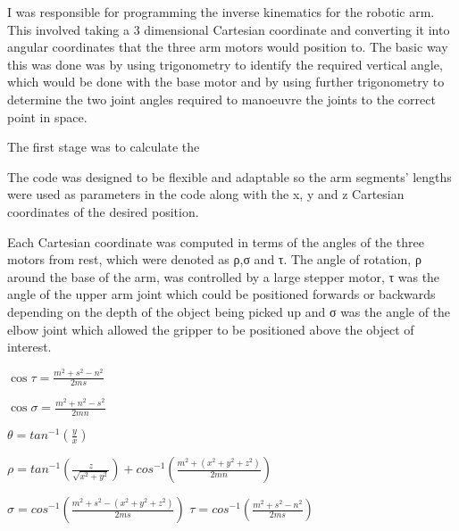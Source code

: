 I was responsible for programming the inverse kinematics for the robotic arm.  This involved taking a 3 dimensional Cartesian coordinate and converting it into angular coordinates that the three arm motors would position to.  The basic way this was done was by using trigonometry to identify the required vertical angle, which would be done with the base motor and by using further trigonometry to determine the two joint angles required to manoeuvre the joints to the correct point in space.

The first stage was to calculate the 	

The code was designed to be flexible and adaptable so the arm segments’ lengths were used as parameters in the code along with the x, y and z Cartesian coordinates of the desired position.

Each Cartesian coordinate was computed in terms of the angles of the three motors from rest, which were denoted as ρ,σ and τ.  The angle of rotation, ρ around the base of the arm, was controlled by a large stepper motor, τ was the angle of the upper arm joint which could be positioned forwards or backwards depending on the depth of the object being picked up and σ was the angle of the elbow joint which allowed the gripper to be positioned above the object of interest.  


$\cos \tau = \frac{m^{2}+s^{2}-n^{2}}{2ms}$


$\cos \sigma  = \frac{m^{2}+n^{2}-s^{2}}{2mn}$


$\theta = tan^{-1}\left (  \frac{y}{x}\right )$

$\rho = tan^{-1}\left ( \frac{z}{\sqrt{{x^{2}+y^{2}}}} \right )+ cos^{-1}\left ( \frac{m^{2}+(x^{2}+y^{2}+z^{2})}{2mn} \right )$

$\sigma = cos^{-1}\left (\frac{m^{2}+s^{2}-(x^{2}+y^{2}+z^{2})}{2ms} \right )$
$\tau = cos^{-1}\left (\frac{m^{2}+s^{2}-n^{2}}{2ms}\right )$

